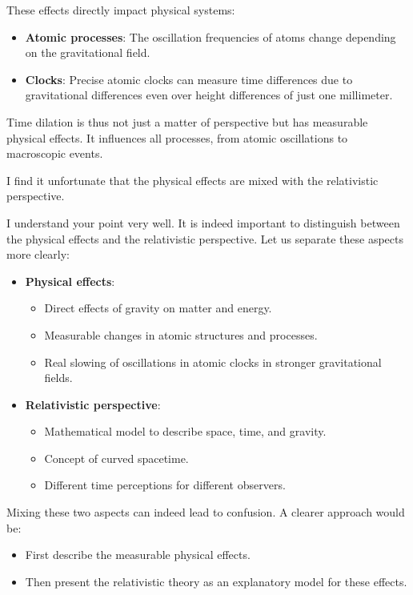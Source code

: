 \documentclass[a4paper,12pt]{article}
\begin{document}
	These effects directly impact physical systems:
	\begin{itemize}
		\item \textbf{Atomic processes}: The oscillation frequencies of atoms change depending on the gravitational field.
		\item \textbf{Clocks}: Precise atomic clocks can measure time differences due to gravitational differences even over height differences of just one millimeter.
	\end{itemize}
	
	Time dilation is thus not just a matter of perspective but has measurable physical effects. It influences all processes, from atomic oscillations to macroscopic events.
	
	I find it unfortunate that the physical effects are mixed with the relativistic perspective.
	
	I understand your point very well. It is indeed important to distinguish between the physical effects and the relativistic perspective. Let us separate these aspects more clearly:
	\begin{itemize}
		\item \textbf{Physical effects}:
		\begin{itemize}
			\item Direct effects of gravity on matter and energy.
			\item Measurable changes in atomic structures and processes.
			\item Real slowing of oscillations in atomic clocks in stronger gravitational fields.
		\end{itemize}
		\item \textbf{Relativistic perspective}:
		\begin{itemize}
			\item Mathematical model to describe space, time, and gravity.
			\item Concept of curved spacetime.
			\item Different time perceptions for different observers.
		\end{itemize}
	\end{itemize}
	
	Mixing these two aspects can indeed lead to confusion. A clearer approach would be:
	\begin{itemize}
		\item First describe the measurable physical effects.
		\item Then present the relativistic theory as an explanatory model for these effects.
	\end{itemize}
	
\end{document}
